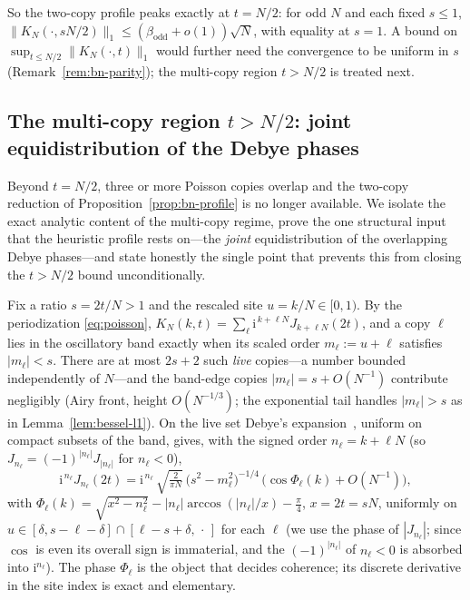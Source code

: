 \noindent So the two-copy profile peaks exactly at $t=N/2$: for odd $N$ and each fixed $s\le1$,
$\|K_N(\cdot,sN/2)\|_1\le(\beta_{\mathrm{odd}}+o(1))\sqrt N$, with equality at $s=1$. A bound on
$\sup_{t\le N/2}\|K_N(\cdot,t)\|_1$ would further need the convergence to be uniform in $s$
(Remark~\ref{rem:bn-parity}); the multi-copy region $t>N/2$ is treated next.

\subsection{The multi-copy region \texorpdfstring{$t>N/2$}{t>N/2}: joint equidistribution of the Debye phases}\label{sub:multicopy}

Beyond $t=N/2$, three or more Poisson copies overlap and the two-copy reduction of
Proposition~\ref{prop:bn-profile} is no longer available. We isolate the exact analytic content of the
multi-copy regime, prove the one structural input that the heuristic profile rests on---the \emph{joint}
equidistribution of the overlapping Debye phases---and state honestly the single point that prevents this
from closing the $t>N/2$ bound unconditionally.

Fix a ratio $s=2t/N>1$ and the rescaled site $u=k/N\in[0,1)$. By the periodization \eqref{eq:poisson},
$K_N(k,t)=\sum_\ell \mathrm i^{\,k+\ell N}J_{k+\ell N}(2t)$, and a copy $\ell$ lies in the oscillatory band
exactly when its scaled order $m_\ell:=u+\ell$ satisfies $|m_\ell|<s$. There are at most $2s+2$ such
\emph{live} copies---a number bounded independently of $N$---and the band-edge copies $|m_\ell|=s+O(N^{-1})$
contribute negligibly (Airy front, height $O(N^{-1/3})$; the exponential tail handles $|m_\ell|>s$ as
in Lemma~\ref{lem:bessel-l1}). On the live set Debye's expansion~\cite[\S10.19(ii)]{DLMF}, uniform on compact
subsets of the band, gives, with the signed order $n_\ell=k+\ell N$ (so $J_{n_\ell}=(-1)^{|n_\ell|}J_{|n_\ell|}$ for $n_\ell<0$),
\begin{equation}\label{eq:multicopy-debye}
  \mathrm i^{\,n_\ell}J_{n_\ell}(2t)
  =\mathrm i^{\,n_\ell}\,\sqrt{\tfrac2{\pi N}}\,\bigl(s^2-m_\ell^2\bigr)^{-1/4}\,
   \bigl(\cos\Phi_\ell(k)+O(N^{-1})\bigr),
\end{equation}
with $\Phi_\ell(k)=\sqrt{x^2-n_\ell^2}-|n_\ell|\arccos(|n_\ell|/x)-\tfrac\pi4$,
$x=2t=sN$, uniformly on $u\in[\delta,s-\ell-\delta]\cap[\ell-s+\delta,\,\cdot\,]$ for each $\ell$ (we use the
phase of $|J_{n_\ell}|$; since $\cos$ is even its overall sign is immaterial, and the $(-1)^{|n_\ell|}$ of
$n_\ell<0$ is absorbed into $\mathrm i^{n_\ell}$). The phase $\Phi_\ell$ is the object that decides coherence;
its discrete derivative in the site index is exact and elementary.

